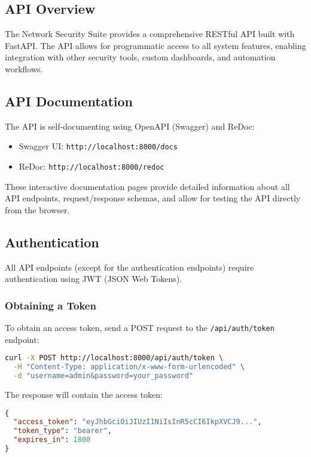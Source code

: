 \subsection{API Overview}
The Network Security Suite provides a comprehensive RESTful API built with FastAPI. The API allows for programmatic access to all system features, enabling integration with other security tools, custom dashboards, and automation workflows.

\subsection{API Documentation}
The API is self-documenting using OpenAPI (Swagger) and ReDoc:

\begin{itemize}
    \item Swagger UI: \texttt{http://localhost:8000/docs}
    \item ReDoc: \texttt{http://localhost:8000/redoc}
\end{itemize}

These interactive documentation pages provide detailed information about all API endpoints, request/response schemas, and allow for testing the API directly from the browser.

\subsection{Authentication}
All API endpoints (except for the authentication endpoints) require authentication using JWT (JSON Web Tokens).

\subsubsection{Obtaining a Token}
To obtain an access token, send a POST request to the \texttt{/api/auth/token} endpoint:

\begin{lstlisting}[language=bash, caption=Obtaining an Access Token]
curl -X POST http://localhost:8000/api/auth/token \
  -H "Content-Type: application/x-www-form-urlencoded" \
  -d "username=admin&password=your_password"
\end{lstlisting}

The response will contain the access token:

\begin{lstlisting}[language=json, caption=Token Response]
{
  "access_token": "eyJhbGciOiJIUzI1NiIsInR5cCI6IkpXVCJ9...",
  "token_type": "bearer",
  "expires_in": 1800
}
\end{lstlisting}

